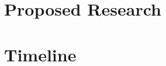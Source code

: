 \documentclass[modern]{aastex62}
\begin{document}






\section{Proposed Research}

\section{Timeline}




\end{document}
